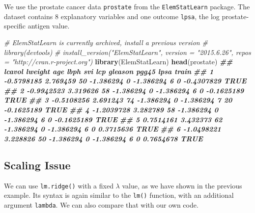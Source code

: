 \documentclass[
]{book}
\newenvironment{Shaded}{\begin{snugshade}}{\end{snugshade}}
\newcommand{\CommentTok}[1]{\textcolor[rgb]{0.56,0.35,0.01}{\textit{#1}}}
\newcommand{\DocumentationTok}[1]{\textcolor[rgb]{0.56,0.35,0.01}{\textbf{\textit{#1}}}}
\newcommand{\FunctionTok}[1]{\textcolor[rgb]{0.13,0.29,0.53}{\textbf{#1}}}
\newcommand{\NormalTok}[1]{#1}
\theoremstyle{definition}
\theoremstyle{definition}
\theoremstyle{definition}
\theoremstyle{definition}
\theoremstyle{remark}
\begin{document}
We use the prostate cancer data \texttt{prostate} from the \texttt{ElemStatLearn} package. The dataset contains 8 explanatory variables and one outcome \texttt{lpsa}, the log prostate-specific antigen value.

\begin{Shaded}
\begin{Highlighting}[]
  \CommentTok{\# ElemStatLearn is currently archived, install a previous version}
  \CommentTok{\# library(devtools)}
  \CommentTok{\# install\_version("ElemStatLearn", version = "2015.6.26", repos = "http://cran.r{-}project.org")}
  \FunctionTok{library}\NormalTok{(ElemStatLearn)}
  \FunctionTok{head}\NormalTok{(prostate)}
\DocumentationTok{\#\#       lcavol  lweight age      lbph svi       lcp gleason pgg45       lpsa train}
\DocumentationTok{\#\# 1 {-}0.5798185 2.769459  50 {-}1.386294   0 {-}1.386294       6     0 {-}0.4307829  TRUE}
\DocumentationTok{\#\# 2 {-}0.9942523 3.319626  58 {-}1.386294   0 {-}1.386294       6     0 {-}0.1625189  TRUE}
\DocumentationTok{\#\# 3 {-}0.5108256 2.691243  74 {-}1.386294   0 {-}1.386294       7    20 {-}0.1625189  TRUE}
\DocumentationTok{\#\# 4 {-}1.2039728 3.282789  58 {-}1.386294   0 {-}1.386294       6     0 {-}0.1625189  TRUE}
\DocumentationTok{\#\# 5  0.7514161 3.432373  62 {-}1.386294   0 {-}1.386294       6     0  0.3715636  TRUE}
\DocumentationTok{\#\# 6 {-}1.0498221 3.228826  50 {-}1.386294   0 {-}1.386294       6     0  0.7654678  TRUE}
\end{Highlighting}
\end{Shaded}

\hypertarget{scaling-issue}{%
\subsection{Scaling Issue}\label{scaling-issue}}

We can use \texttt{lm.ridge()} with a fixed \(\lambda\) value, as we have shown in the previous example. Its syntax is again similar to the \texttt{lm()} function, with an additional argument \texttt{lambda}. We can also compare that with our own code.
\end{document}
